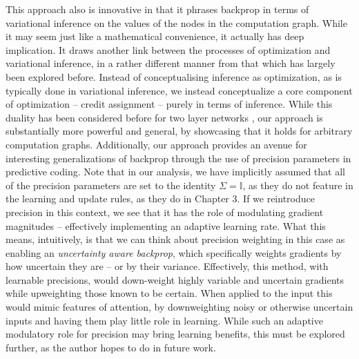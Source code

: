 This approach also is innovative in that it phrases backprop in terms of variational inference on the values of the nodes in the computation graph. While it may seem just like a mathematical convenience, it actually has deep implication. It draws another link between the processes of optimization and variational inference, in a rather different manner from that which has largely been explored before. Instead of conceptualising inference as optimization, as is typically done in variational inference, we instead conceptualize a core component of optimization -- credit assignment -- purely in terms of inference. While this duality has been considered before for two layer networks \citep{amari1995information}, our approach is substantially more powerful and general, by showcasing that it holds for arbitrary computation graphs. Additionally, our approach provides an avenue for interesting generalizations of backprop through the use of precision parameters in predictive coding. Note that in our analysis, we have implicitly assumed that all of the precision parameters are set to the identity $\Sigma = \mathbb{I}$, as they do not feature in the learning and update rules, as they do in Chapter 3. If we reintroduce precision in this context, we see that it has the role of modulating gradient magnitudes -- effectively implementing an adaptive learning rate. What this means, intuitively, is that we can think about precision weighting in this case as enabling an \emph{uncertainty aware backprop}, which specifically weights gradients by how uncertain they are -- or by their variance. Effectively, this method, with learnable precisions, would down-weight highly variable and uncertain gradients while upweighting those known to be certain. When applied to the input this would mimic features of attention, by downweighting noisy or otherwise uncertain inputs and having them play little role in learning. While such an adaptive modulatory role for precision may bring learning benefits, this must be explored further, as the author hopes to do in future work.

